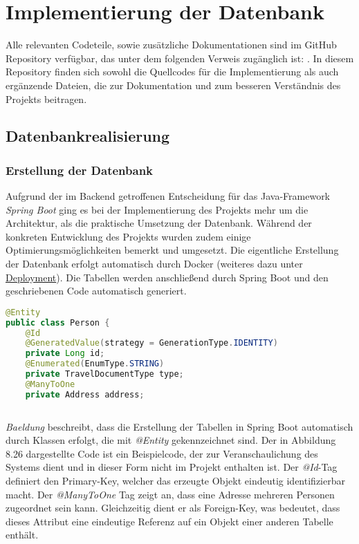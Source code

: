 \section{Implementierung der Datenbank}
Alle relevanten Codeteile, sowie zusätzliche Dokumentationen sind im GitHub Repository verfügbar, das unter dem folgenden Verweis zugänglich ist: \cite{git:Eq}. In diesem Repository finden sich sowohl die Quellcodes für die Implementierung als auch ergänzende Dateien, die zur Dokumentation und zum besseren Verständnis des Projekts beitragen.

\subsection{Datenbankrealisierung}
\subsubsection{Erstellung der Datenbank}
Aufgrund der im Backend getroffenen Entscheidung für das Java-Framework \textit{Spring Boot} ging es bei der Implementierung des Projekts mehr um die Architektur, als die praktische Umsetzung der Datenbank. Während der konkreten Entwicklung des Projekts wurden zudem einige Optimierungsmöglichkeiten bemerkt und umgesetzt. Die eigentliche Erstellung der Datenbank erfolgt automatisch durch \gls{Docker} (weiteres dazu unter \hyperref[sec:deployment]{Deployment}). Die Tabellen werden anschließend durch Spring Boot und den geschriebenen Code automatisch generiert.

\begin{lstlisting}[language=Java, caption={Code-Ausschnitt: Erstellung einer Tabelle in der Datenbank.}]
@Entity
public class Person {
	@Id
	@GeneratedValue(strategy = GenerationType.IDENTITY)
	private Long id;
	@Enumerated(EnumType.STRING)
	private TravelDocumentType type;
	@ManyToOne
	private Address address;
			
\end{lstlisting}
	
	\noindent \textit{Baeldung} \cite{SB:Database} beschreibt, dass die Erstellung der Tabellen in Spring Boot automatisch durch Klassen erfolgt, die mit \textit{@Entity} gekennzeichnet sind. Der in Abbildung 8.26 dargestellte Code ist ein Beispielcode, der zur Veranschaulichung des Systems dient und in dieser Form nicht im Projekt enthalten ist. Der \textit{@Id}-Tag definiert den Primary-Key, welcher das erzeugte Objekt eindeutig identifizierbar macht. Der \textit{@ManyToOne} Tag zeigt an, dass eine Adresse mehreren Personen zugeordnet sein kann. Gleichzeitig dient er als Foreign-Key, was bedeutet, dass dieses Attribut eine eindeutige Referenz auf ein Objekt einer anderen Tabelle enthält.
	
